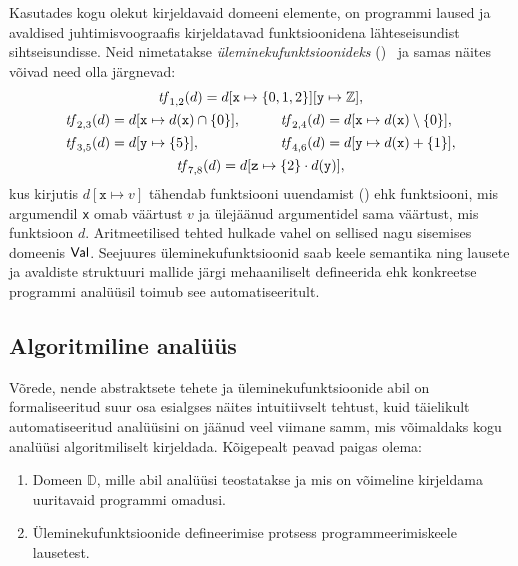 \documentclass[../thesis.tex]{subfiles}
\begin{document}
Kasutades kogu olekut kirjeldavaid domeeni elemente, on programmi laused ja avaldised juhtimisvoograafis kirjeldatavad funktsioonidena lähteseisundist sihtseisundisse. Neid nimetatakse \emph{üleminekufunktsioonideks} ()~\cite{vojdani_magister} ja samas näites võivad need olla järgnevad:
\begin{gather*}
	\mathit{tf}_{1,2}(d) = d[\texttt{x} \mapsto \{0, 1, 2\}][\texttt{y} \mapsto \mathbb{Z}], \\
	\begin{aligned}
		\mathit{tf}_{2,3}(d) &= d[\texttt{x} \mapsto d(\texttt{x}) \cap \{0\}],\qquad &
		\mathit{tf}_{2,4}(d) &= d[\texttt{x} \mapsto d(\texttt{x}) \setminus \{0\}], \\
		\mathit{tf}_{3,5}(d) &= d[\texttt{y} \mapsto \{5\}], &
		\mathit{tf}_{4,6}(d) &= d[\texttt{y} \mapsto d(\texttt{x}) + \{1\}],
	\end{aligned} \\
	\mathit{tf}_{7,8}(d) = d[\texttt{z} \mapsto \{2\} \cdot d(\texttt{y})],
\end{gather*}
kus kirjutis $d[\texttt{x} \mapsto v]$ tähendab funktsiooni uuendamist () ehk funktsiooni, mis argumendil \texttt{x} omab väärtust $v$ ja ülejäänud argumentidel sama väärtust, mis funktsioon $d$. Aritmeetilised tehted hulkade vahel on sellised nagu sisemises domeenis $\mathsf{Val}$.
Seejuures üleminekufunktsioonid saab keele semantika ning lausete ja avaldiste struktuuri mallide järgi mehaaniliselt defineerida ehk konkreetse programmi analüüsil toimub see automatiseeritult.


\subsection{Algoritmiline analüüs}
Võrede, nende abstraktsete tehete ja üleminekufunktsioonide abil on formaliseeritud suur osa esialgses näites intuitiivselt tehtust, kuid täielikult automatiseeritud analüüsini on jäänud veel viimane samm, mis võimaldaks kogu analüüsi algoritmiliselt kirjeldada. Kõigepealt peavad paigas olema:
\begin{enumerate}[noitemsep]
	\item Domeen $\mathbb{D}$, mille abil analüüsi teostatakse ja mis on võimeline kirjeldama uuritavaid programmi omadusi.
	\item Üleminekufunktsioonide defineerimise protsess programmeerimiskeele lausetest.
\end{enumerate}
\end{document}
